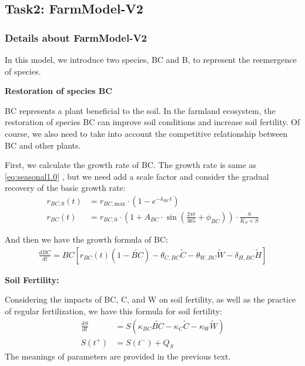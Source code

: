 \documentclass[12pt]{article}  %
\begin{document}
\subsection{Task2: FarmModel-V2}
\subsubsection{Details about FarmModel-V2}
In this model, we introduce two species, BC and B, to represent the reemergence of species.

\noindent\textbf{Restoration of species BC}

BC represents a plant beneficial to the soil. In the farmland 
ecosystem, the restoration of species BC can improve soil conditions and 
increase soil fertility. Of course, we also need to take into account the 
competitive relationship between BC and other plants.

First, we calculate the growth rate of BC. The growth rate is same as \eqref{eq:seasonal1.0}
    , but we need add a scale factor and consider the gradual recovery of the basic growth rate:
    \begin{equation}
        \begin{aligned}
            r_{BC,0}(t) &= r_{BC,\text{max}} \cdot \left(1 - e^{-k_{BC} t}\right)\\
            r_{BC}(t) &= r_{BC,0} \cdot \left(1 + A_{BC} \cdot \sin\left(\frac{2\pi t}{365} + \phi_{BC}\right)\right) \cdot \frac{S}{K_S + S}
        \end{aligned}\label{eq:BC1.0}
    \end{equation}
    

And then we have the growth formula of BC:
    \begin{align}
        \frac{dBC}{dt} = BC \left[ r_{BC}(t) \left( 1 - \tilde{BC} \right) - \theta_{C,BC} \tilde{C} - \theta_{W,BC} \tilde{W} - \delta_{H,BC} \tilde{H} \right]\label{eq:BC1.1}
\end{align}

\noindent\textbf{Soil Fertility:} 

Considering the impacts of BC, C, and W on soil fertility, as well as the practice of regular fertilization, 
we have this formula for soil fertility:
\begin{equation}
    \begin{aligned}
        \frac{dS}{dt} &= S(\kappa_{BC} \tilde{BC} -\kappa_C \tilde{C} - \kappa_W \tilde{W} )\\
        S(t^+) &= S(t^-) + Q_S
    \end{aligned}\label{eq:soil1.0}
\end{equation}
The meanings of parameters are provided in the previous text.
\end{document}

